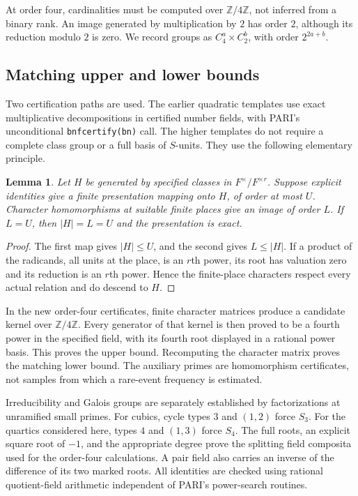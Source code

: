 \documentclass[11pt]{article}
\newtheorem{lemma}[theorem]{Lemma}
\theoremstyle{definition}\newtheorem{definition}[theorem]{Definition}
\newcommand{\Z}{\mathbb Z}
\begin{document}
At order four, cardinalities must be computed over $\Z/4\Z$, not
inferred from a binary rank. An image generated by multiplication by
$2$ has order $2$, although its reduction modulo $2$ is zero.
We record groups as $C_4^a\times C_2^b$, with order $2^{2a+b}$.

\subsection{Matching upper and lower bounds}
Two certification paths are used. The earlier quadratic templates
use exact multiplicative decompositions in certified number fields,
with PARI's unconditional \texttt{bnfcertify(bn)} call. The higher
templates do not require a complete class group or a full basis of
$S$-units. They use the following elementary principle.
\begin{lemma}\label{lem:sandwich}
Let $H$ be generated by specified classes in $F^\times/F^{\times r}$.
Suppose explicit identities give a finite presentation mapping onto
$H$, of order at most $U$. Character homomorphisms at suitable finite
places give an image of order $L$. If $L=U$, then $|H|=L=U$ and the
presentation is exact.
\end{lemma}
\begin{proof}
The first map gives $|H|\le U$, and the second gives $L\le|H|$.
If a product of the radicands, all units at the place, is an $r$th
power, its root has valuation zero and its reduction is an $r$th
power. Hence the finite-place characters respect every actual
relation and do descend to $H$.
\end{proof}
In the new order-four certificates, finite character matrices produce
a candidate kernel over $\Z/4\Z$. Every generator of that kernel is
then proved to be a fourth power in the specified field, with its
fourth root displayed in a rational power basis. This proves the
upper bound. Recomputing the character matrix proves the matching
lower bound. The auxiliary primes are homomorphism certificates,
not samples from which a rare-event frequency is estimated.

Irreducibility and Galois groups are separately established by
factorizations at unramified small primes. For cubics, cycle types
$3$ and $(1,2)$ force $S_3$. For the quartics considered here,
types $4$ and $(1,3)$ force $S_4$. The full roots, an explicit
square root of $-1$, and the appropriate degree prove the splitting
field composita used for the order-four calculations. A pair field
also carries an inverse of the difference of its two marked roots.
All identities are checked using rational quotient-field arithmetic
independent of PARI's power-search routines.
\end{document}
